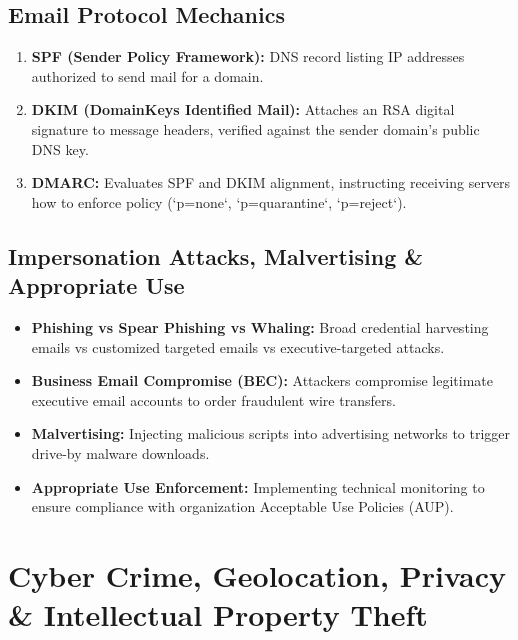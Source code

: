 \documentclass[12pt,a4paper]{article}
\begin{document}
\subsection{Email Protocol Mechanics}
\begin{enumerate}[leftmargin=*, itemsep=3pt]
  \item \textbf{SPF (Sender Policy Framework):} DNS record listing IP addresses authorized to send mail for a domain.
  \item \textbf{DKIM (DomainKeys Identified Mail):} Attaches an RSA digital signature to message headers, verified against the sender domain's public DNS key.
  \item \textbf{DMARC:} Evaluates SPF and DKIM alignment, instructing receiving servers how to enforce policy (`p=none`, `p=quarantine`, `p=reject`).
\end{enumerate}

\subsection{Impersonation Attacks, Malvertising \& Appropriate Use}
\begin{itemize}[leftmargin=*, itemsep=3pt]
  \item \textbf{Phishing vs Spear Phishing vs Whaling:} Broad credential harvesting emails vs customized targeted emails vs executive-targeted attacks.
  \item \textbf{Business Email Compromise (BEC):} Attackers compromise legitimate executive email accounts to order fraudulent wire transfers.
  \item \textbf{Malvertising:} Injecting malicious scripts into advertising networks to trigger drive-by malware downloads.
  \item \textbf{Appropriate Use Enforcement:} Implementing technical monitoring to ensure compliance with organization Acceptable Use Policies (AUP).
\end{itemize}

\section{Cyber Crime, Geolocation, Privacy \& Intellectual Property Theft}
\end{document}
